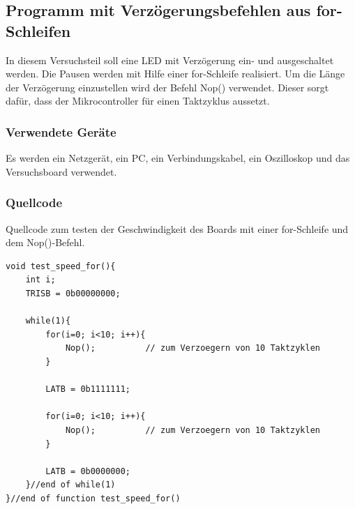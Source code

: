 \documentclass[12pt,a4paper]{article}
\begin{document}
\subsection{Programm mit Verzögerungsbefehlen aus for-Schleifen}

In diesem Versuchsteil soll eine LED  mit Verzögerung ein- und ausgeschaltet werden. Die Pausen werden mit Hilfe einer for-Schleife realisiert. Um die Länge der Verzögerung einzustellen wird der Befehl Nop() verwendet. Dieser sorgt dafür, dass der Mikrocontroller für einen Taktzyklus aussetzt.

\subsubsection*{Verwendete Geräte}

Es werden ein Netzgerät, ein PC, ein Verbindungskabel, ein Oszilloskop und das Versuchsboard verwendet.


\subsubsection*{Quellcode}

Quellcode zum testen der Geschwindigkeit des Boards mit einer for-Schleife und dem Nop()-Befehl.

\lstset{language=C, basicstyle=\tiny}
\begin{lstlisting}[caption = {Geschwindigkeitstest mit einer for-Schleife}, label=lst:g_2,captionpos=b]
void test_speed_for(){
	int i;
	TRISB = 0b00000000;
	
	while(1){
		for(i=0; i<10; i++){
			Nop();			// zum Verzoegern von 10 Taktzyklen
		}
	
		LATB = 0b1111111;
		
		for(i=0; i<10; i++){
			Nop();			// zum Verzoegern von 10 Taktzyklen
		}
		
		LATB = 0b0000000;
	}//end of while(1)
}//end of function test_speed_for()
\end{lstlisting}
\end{document}
